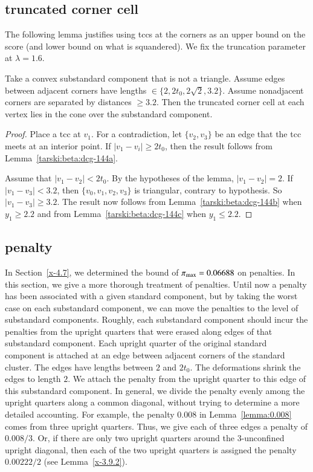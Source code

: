 \subsection{truncated corner cell} %

The following lemma justifies using tccs at the corners as an upper
bound on the score (and lower bound on what is squandered). We fix the
truncation parameter at $\lambda=1.6$.

\begin{lemma}
Take a convex substandard component that is not a triangle.  Assume edges between
adjacent corners have lengths $\in\{2,2t_0,2\sqrt{2},3.2\}$. Assume
nonadjacent corners are separated by distances $\ge3.2$.  Then the
truncated corner cell at each vertex lies in the cone over the
substandard component.
\end{lemma}

\begin{proof}
Place a tcc at $v_1$. For a contradiction, let $\{v_2,v_3\}$ be an
edge that the tcc meets at an interior point.  
If $|v_1-v_i|\ge 2t_0$, then the result follows from
Lemma~\ref{tarski:beta:dcg-144a}.  

Assume that
 $|v_1-v_2|<2t_0$.  By the hypotheses of the lemma,
$|v_1-v_2|=2$.  If $|v_1-v_3|<3.2$, then $\{v_0,v_1,v_2,v_3\}$ is
triangular, contrary to hypothesis.  So $|v_1-v_3|\ge3.2$.
The result now follows from Lemma~\ref{tarski:beta:dcg-144b} when
$y_1\ge 2.2$ and from Lemma~\ref{tarski:beta:dcg-144c} when
$y_1\le 2.2$.
\end{proof}


\subsection{penalty} %
    \label{sec:penalty1}

In Section~\ref{x-4.7}, we determined the bound of
$\pi_{\max}=0.06688$ on penalties. In this section, we give a more
thorough treatment of penalties. Until now a penalty has been
associated with a given standard component, but by taking the worst
case on each substandard component, we can move the penalties to the level of
substandard components.   Roughly, each substandard component should incur the penalties
from the upright quarters that were erased along edges of that
substandard component.  Each upright quarter of the original standard component
is attached at an edge between adjacent corners of the standard
cluster. The edges have lengths between $2$ and $2t_0$.  The
deformations shrink the edges to length $2$.  We attach the
penalty from the upright quarter to this edge of this substandard component.
In general, we divide the penalty evenly among the upright
quarters along a common diagonal, without trying to determine a
more detailed accounting. For example, the penalty $0.008$ in
Lemma~\ref{lemma:0.008} comes from three upright quarters.  Thus,
we give each of three edges a penalty of $0.008/3$. Or, if there
are only two upright quarters around the $3$-unconfined upright
diagonal, then each of the two upright quarters is assigned the
penalty $0.00222/2$ (see Lemma~\ref{x-3.9.2}).

